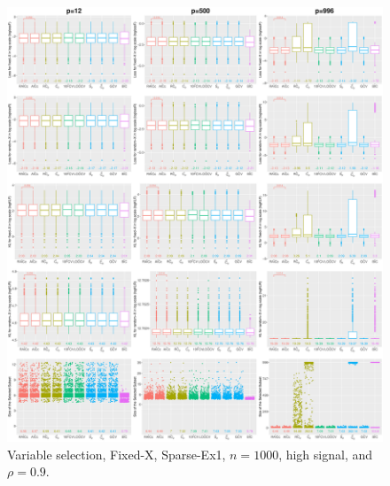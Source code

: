 \begin{figure}[!ht]
\centering
\includegraphics[width=\textwidth]{figures/supplement/fixedx/subset_selection/Sparse-Ex1_n1000_hsnr_rho09.eps}
\caption{Variable selection, Fixed-X, Sparse-Ex1, $n=1000$, high signal, and $\rho=0.9$.}
\end{figure}
\clearpage
